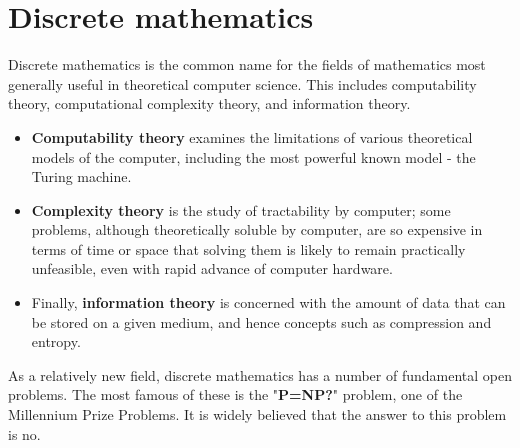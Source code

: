 \documentclass[]{article}
\title{}
\author{}
\begin{document}
\section{Discrete mathematics}


Discrete mathematics is the common name for the fields of mathematics most generally useful in theoretical computer science. This includes computability theory, computational complexity theory, and information theory. 
\begin{itemize}
\item \textbf{Computability theory} examines the limitations of various theoretical models of the computer, including the most powerful known model - the Turing machine. 

\item \textbf{Complexity theory} is the study of tractability by computer; some problems, although theoretically soluble by computer, are so expensive in terms of time or space that solving them is likely to remain practically unfeasible, even with rapid advance of computer hardware. 

\item Finally, \textbf{information theory} is concerned with the amount of data that can be stored on a given medium, and hence concepts such as compression and entropy.
\end{itemize}


As a relatively new field, discrete mathematics has a number of fundamental open problems. The most famous of these is the "\textbf{\textbf{P=NP?}}" problem, one of the Millennium Prize Problems. It is widely believed that the answer to this problem is no.
\end{document}

